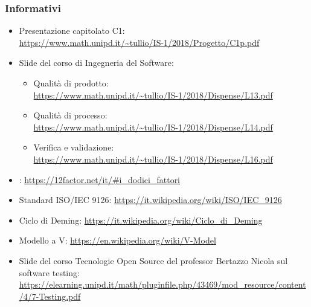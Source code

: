     \subsubsection{Informativi}\label{riferimenti informativi}
    \begin{itemize}
    	\item Presentazione capitolato C1:\\ \url{https://www.math.unipd.it/~tullio/IS-1/2018/Progetto/C1p.pdf}
    	\item Slide del corso di Ingegneria del Software:
    	
    	\begin{itemize}
    		\item Qualità di prodotto:\\ \url{https://www.math.unipd.it/~tullio/IS-1/2018/Dispense/L13.pdf}
    		\item Qualità di processo:\\ \url{https://www.math.unipd.it/~tullio/IS-1/2018/Dispense/L14.pdf}
    		\item Verifica e validazione:\\
    		\url{https://www.math.unipd.it/~tullio/IS-1/2018/Dispense/L16.pdf}
    	\end{itemize}
    	\item {}:
    	\url{https://12factor.net/it/#i_dodici_fattori}
    	\item Standard ISO/IEC 9126:
    	\url{https://it.wikipedia.org/wiki/ISO/IEC_9126}
    	\item Ciclo di Deming:
    	\url{https://it.wikipedia.org/wiki/Ciclo_di_Deming}
    	\item Modello a V:
    	\url{https://en.wikipedia.org/wiki/V-Model}
    	\item Slide del corso Tecnologie Open Source del professor Bertazzo Nicola sul software testing:\\
    	\url{https://elearning.unipd.it/math/pluginfile.php/43469/mod_resource/content/4/7-Testing.pdf}
    \end{itemize}